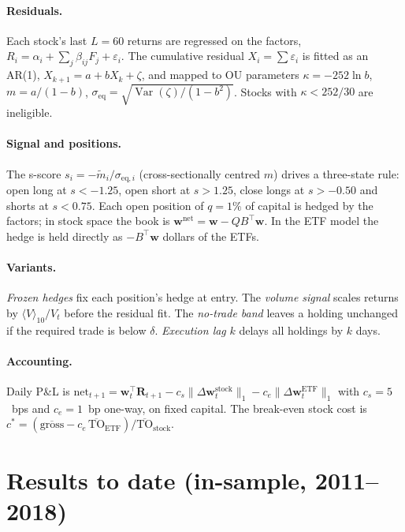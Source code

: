 \documentclass[11pt,a4paper]{article}
\DeclareMathOperator{\Var}{Var}
\begin{document}
\paragraph{Residuals.} Each stock's last $L=60$ returns are regressed on the factors,
$R_i = \alpha_i + \sum_j \beta_{ij} F_j + \varepsilon_i$. The cumulative residual
$X_i = \sum \varepsilon_i$ is fitted as an AR(1), $X_{k+1} = a + bX_k + \zeta$, and mapped to OU
parameters $\kappa = -252\ln b$, $m = a/(1-b)$, $\sigma_{\text{eq}} = \sqrt{\Var(\zeta)/(1-b^2)}$.
Stocks with $\kappa < 252/30$ are ineligible.

\paragraph{Signal and positions.} The s-score $s_i = -\tilde m_i / \sigma_{\text{eq},i}$
(cross-sectionally centred $m$) drives a three-state rule: open long at $s<-1.25$, open short
at $s>1.25$, close longs at $s>-0.50$ and shorts at $s<0.75$. Each open position of
$q = 1\%$ of capital is hedged by the factors; in stock space the book is
$\bm w^{\text{net}} = \bm w - Q B^\top \bm w$. In the ETF model the hedge is held directly as
$-B^\top \bm w$ dollars of the ETFs.

\paragraph{Variants.} \emph{Frozen hedges} fix each position's hedge at entry. The \emph{volume
signal} scales returns by $\langle V\rangle_{10}/V_t$ before the residual fit. The \emph{no-trade
band} leaves a holding unchanged if the required trade is below $\delta$. \emph{Execution lag}
$k$ delays all holdings by $k$ days.

\paragraph{Accounting.} Daily P\&L is
$\text{net}_{t+1} = \bm w_t^\top \bm R_{t+1} - c_s\|\Delta \bm w^{\text{stock}}_t\|_1 - c_e\|\Delta \bm w^{\text{ETF}}_t\|_1$
with $c_s = 5$~bps and $c_e = 1$~bp one-way, on fixed capital. The break-even stock cost is
$c^\ast = (\overline{\text{gross}} - c_e\,\overline{\text{TO}}_{\text{ETF}})/\overline{\text{TO}}_{\text{stock}}$.

\section{Results to date (in-sample, 2011--2018)}
\label{sec:results}
\end{document}
